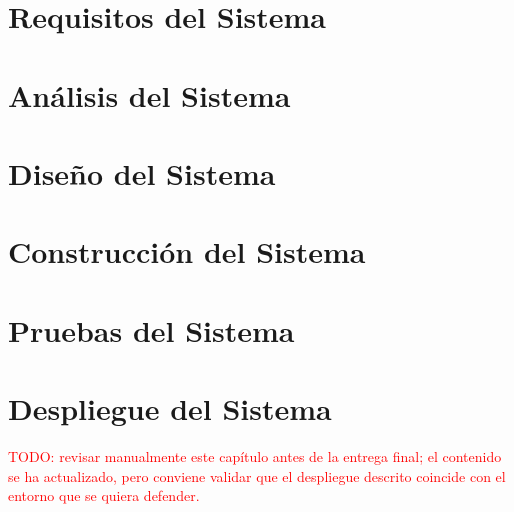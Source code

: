 \null\vfill

\chapter{Requisitos del Sistema}


\newpage{\ }
\cleardoublepage

\chapter{Análisis del Sistema}


\newpage{\ }
\cleardoublepage

\chapter{Diseño del Sistema}


\newpage{\ }
\cleardoublepage

\chapter{Construcción del Sistema}


\newpage{\ }
\cleardoublepage

\chapter{Pruebas del Sistema}


\newpage{\ }
\cleardoublepage

\chapter{Despliegue del Sistema}
\textcolor{red}{TODO: revisar manualmente este capítulo antes de la entrega final; el contenido se ha actualizado, pero conviene validar que el despliegue descrito coincide con el entorno que se quiera defender.}


